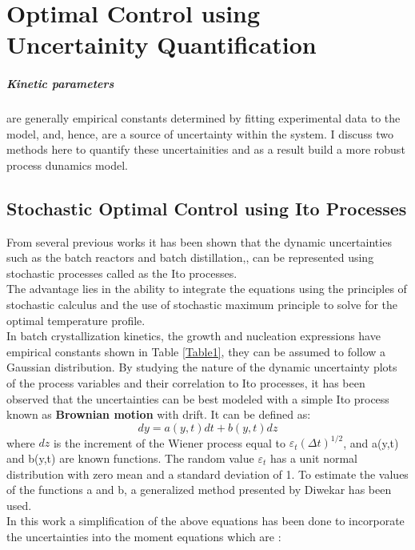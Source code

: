 
\chapter{Optimal Control using Uncertainity Quantification}

\paragraph{Kinetic parameters} are generally empirical constants determined by fitting experimental data to the model, and, hence, are a source of uncertainty within the system. I discuss two methods here to quantify these uncertainities and as a result build a more robust process dunamics model.

\section{Stochastic Optimal Control using Ito Processes}

From several previous works it has been shown that the dynamic uncertainties
such as the batch reactors\cite{benavides2} and batch distillation,\cite{diwekar}, can be represented using stochastic processes called as the Ito processes.\\
The advantage lies in the ability to integrate the equations using the principles of stochastic calculus and the use of stochastic maximum principle to solve for the optimal temperature profile. \\
In batch crystallization kinetics, the growth and nucleation expressions have empirical constants shown in Table \ref{Table1}, they can be assumed to follow a Gaussian distribution\cite{yenkie}. By studying the nature of the dynamic uncertainty plots of the process variables and their correlation to Ito processes, it has been observed that the uncertainties can be best modeled with a simple Ito process known as \textbf{Brownian motion} with drift\cite{diwekar}\cite{wong}. It can be defined as:
\begin{equation}
dy = a(y,t)dt + b(y,t)dz
\end{equation}
where $dz$ is the increment of the Wiener process equal to $\varepsilon_{t}(\Delta t)^{1/2}$, and a(y,t) and b(y,t) are known functions. The random value $\varepsilon_{t}$  has a unit normal distribution with zero mean
and a standard deviation of 1. To estimate the values of the functions a and b, a generalized method presented by Diwekar\cite{diwekar} has been used.\\
In this work a simplification of the above equations has been done to incorporate the uncertainties into the moment equations which are\cite{yenkie} :
\begin{align*}



\end{align*} 
